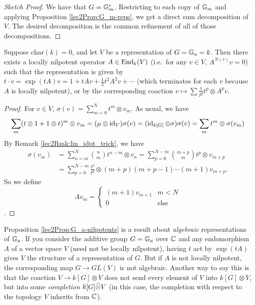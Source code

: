 \begin{proof}[Sketch Proof]
 We have that $G=\mathbb{G}_m^r$. Restricting to each copy of $\mathbb{G}_m$ and applying Proposition \ref{lec2Prop:G_m-reps}, we get a direct sum decomposition of $V$. The desired decomposition is the common refinement of all of those decompositions.
\end{proof}
\begin{proposition}\label{lec2Prop:G_a-nilpotents}
 Suppose $\mathrm{char}(k)=0$, and let $V$ be a representation of $G=\mathbb{G}_a=k$. Then there exists a locally nilpotent operator $A\in \operatorname{End}_k(V)$ (i.e.~for any $v\in V$, $A^{N(v)}v=0$) such that the representation is given by $t\cdot v= \exp(tA)v=1+tAv+\frac12 t^2A^2v+\cdots$ (which terminates for each $v$ because $A$ is locally nilpotent), or by the corresponding coaction $v\mapsto \sum \frac{1}{p!}t^p \otimes A^pv$.
\end{proposition}
\begin{proof}
 For $v\in V$, $\sigma(v) = \sum_{m=0}^N t^m\otimes v_m$. As usual, we have
 \[
  \sum_m (t\otimes 1+1\otimes t)^m\otimes v_m = (\mu\otimes \operatorname{id}_V)\sigma(v) = (\operatorname{id}_{k[G]}\otimes \sigma)\sigma(v) = \sum_m t^m\otimes \sigma(v_m)
 \]
 By Remark \ref{lec2Rmk:lin_idpt_trick}, we have
 \begin{align*}
  \sigma(v_m) &= \sum_{n=m}^N \binom{n}{m}t^{n-m}\otimes v_n = \sum_{p=0}^{N-m} \binom{m+p}{m} t^p\otimes v_{m+p}\\
  &= \sum_{p=0}^{N-m} \frac{t^p}{p!}\otimes (m+p)(m+p-1)\cdots(m+1) v_{m+p}.
 \end{align*}
 So we define 
 \[Av_m=
 \begin{cases}
  (m+1)v_{m+1} & m<N\\
  0 & \text{else}
 \end{cases}
 \]
 .
\end{proof}
\begin{remark}
 Proposition \ref{lec2Prop:G_a-nilpotents} is a result about \emph{algebraic} representations of $\mathbb{G}_a$. If you consider the additive group $G=\mathbb{G}_a$ over $\mathbb{C}$ and any endomorphism $A$ of a vector space $V$ (need not be locally nilpotent), having $t$ act by $\exp(tA)$ gives $V$ the structure of a representation of $G$. But if $A$ is not locally nilpotent, the corresponding map $G\to GL(V)$ is not algebraic. Another way to say this is that the coaction $V\to k[G]\otimes V$ does not send every element of $V$ into $k[G]\otimes V$, but into some \emph{completion} $k[G]\widehat{\otimes} V$ (in this case, the completion with respect to the topology $V$ inherits from $\mathbb{C}$).
\end{remark}

